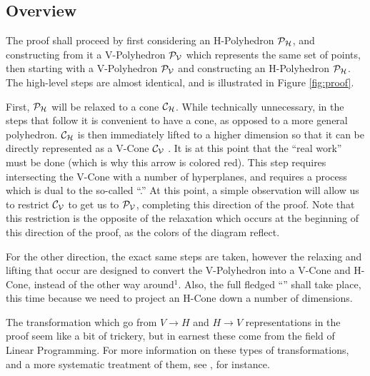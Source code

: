 

\subsection{Overview}
The proof shall proceed by first considering an H-Polyhedron $\mathcal{P}_{\mathcal{H}}$, and constructing from it a V-Polyhedron $\mathcal{P}_{\mathcal{V}}$ which represents the same set of points, then starting with a V-Polyhedron $\mathcal{P}_{\mathcal{V}}$ and constructing an H-Polyhedron $\mathcal{P}_{\mathcal{H}}$.  The high-level steps are almost identical, and is illustrated in Figure \ref{fig:proof}.

First, $\mathcal{P}_{\mathcal{H}}$ will be relaxed to a cone $\mathcal{C}_{\mathcal{H}}$.  While technically unnecessary, in the steps that follow it is convenient to have a cone, as opposed to a more general polyhedron.  $\mathcal{C}_{\mathcal{H}}$ is then immediately lifted to a higher dimension so that it can be directly represented as a V-Cone $\mathcal{C}_{\mathcal{V}}$ .  It is at this point that the ``real work'' must be done (which is why this arrow is colored red).  This step requires intersecting the V-Cone with a number of hyperplanes, and requires a process which is dual to the so-called ``\FME.''  At this point, a simple observation will allow us to restrict $\mathcal{C}_{\mathcal{V}}$ to get us to $\mathcal{P}_{\mathcal{V}}$, completing this direction of the proof.  Note that this restriction is the opposite of the relaxation which occurs at the beginning of this direction of the proof, as the colors of the diagram reflect.

For the other direction, the exact same steps are taken, however the relaxing and lifting that occur are designed to convert the V-Polyhedron into a V-Cone and H-Cone, instead of the other way around$^1$.  Also, the full fledged ``\FME'' shall take place, this time because we need to project an H-Cone down a number of dimensions.

The transformation which go from $V \to H$ and $H \to V$ representations in the proof seem like a bit of trickery, but in earnest these come from the field of Linear Programming.  For more information on these types of transformations, and a more systematic treatment of them, see , for instance.

